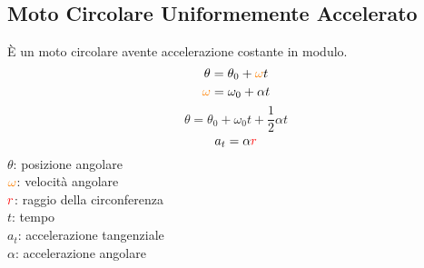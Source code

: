 \subsection{Moto Circolare Uniformemente Accelerato}\label{subsec:cinematica:mrua}
È un moto circolare avente accelerazione costante in modulo.
\begin{equation*}
\theta = \theta_0 + \mathcolor{orange}{\omega}t
\end{equation*}
\begin{equation*}
\mathcolor{orange}{\omega} = \omega_0 + \alpha t
\end{equation*}
\begin{equation*}
\theta = \theta_0 + \omega_0t + \frac{1}{2}\alpha t
\end{equation*}
\begin{equation*}
a_t = \alpha \mathcolor{red}{r}
\end{equation*}
$\theta$: posizione angolare\\
$\mathcolor{orange}{\omega}$: velocità angolare\\
$\mathcolor{red}{r}$: raggio della circonferenza\\
$t$: tempo\\
$a_t$: accelerazione tangenziale\\
$\alpha$: accelerazione angolare
